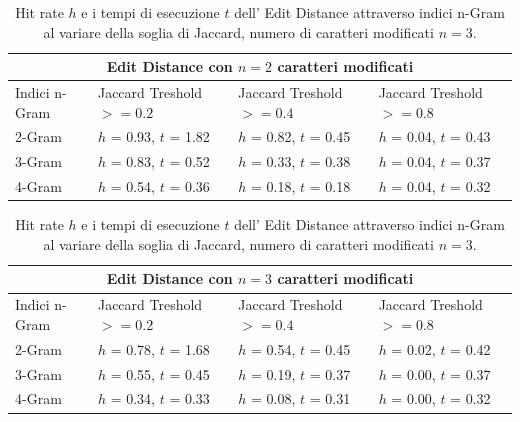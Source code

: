 \documentclass{article}
\begin{document}
\begin{table}[t]
\centering
\begin{tabular}{ |p{3cm}||p{3cm}|p{3cm}|p{3cm}|  }
 \hline
 \multicolumn{4}{|c|}{Edit Distance con $n = 2$ caratteri modificati} \\
 \hline
Indici n-Gram&Jaccard Treshold $>=0.2$ &Jaccard Treshold $>=0.4$&Jaccard Treshold $>=0.8$ \\
 \hline
 2-Gram   & $h$ = 0.93, $t$ = 1.82    &$h$ = 0.82, $t$ = 0.45 &   $h$ = 0.04, $t$ = 0.43\\
 3-Gram &  $h$ = 0.83, $t$ = 0.52  & $h$ = 0.33, $t$ = 0.38   &$h$ = 0.04, $t$ = 0.37\\
 4-Gram &$h$ = 0.54, $t$ = 0.36 & $h$ = 0.18, $t$ = 0.18 &  $h$ = 0.04, $t$ = 0.32\\
 \hline
\end{tabular}
\caption{Hit rate $h$ e i tempi di esecuzione $t$ dell' Edit Distance attraverso indici n-Gram al variare della soglia di Jaccard, numero di caratteri modificati $n = 2$.}
\medskip
\medskip
\centering
\begin{tabular}{ |p{3cm}||p{3cm}|p{3cm}|p{3cm}|  }
 \hline
 \multicolumn{4}{|c|}{Edit Distance con $n = 3$ caratteri modificati} \\
 \hline
Indici n-Gram&Jaccard Treshold $>=0.2$ &Jaccard Treshold $>=0.4$&Jaccard Treshold $>=0.8$ \\
 \hline
 2-Gram   & $h$ = 0.78, $t$ = 1.68    &$h$ = 0.54, $t$ = 0.45 &   $h$ = 0.02, $t$ = 0.42\\
 3-Gram &  $h$ = 0.55, $t$ = 0.45  & $h$ = 0.19, $t$ = 0.37   &$h$ = 0.00, $t$ = 0.37\\
 4-Gram &$h$ = 0.34, $t$ = 0.33 & $h$ = 0.08, $t$ = 0.31 &  $h$ = 0.00, $t$ = 0.32\\
 \hline
\end{tabular}
\caption{Hit rate $h$ e i tempi di esecuzione $t$ dell' Edit Distance attraverso indici n-Gram al variare della soglia di Jaccard, numero di caratteri modificati $n = 3$.}
\end{table}
\end{document}

